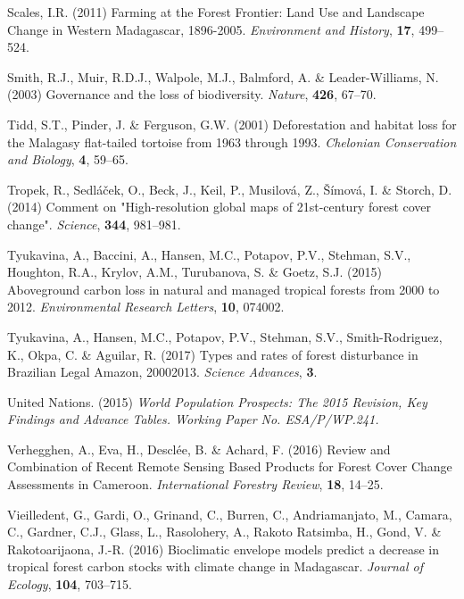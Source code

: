 \documentclass[]{article}
\theoremstyle{definition}
\theoremstyle{definition}
\theoremstyle{definition}
\theoremstyle{remark}
\begin{document}
\leavevmode\hypertarget{ref-Scales2011}{}%
Scales, I.R. (2011) Farming at the Forest Frontier: Land Use and
Landscape Change in Western Madagascar, 1896-2005. \emph{Environment and
History}, \textbf{17}, 499--524.

\leavevmode\hypertarget{ref-Smith2003}{}%
Smith, R.J., Muir, R.D.J., Walpole, M.J., Balmford, A. \&
Leader-Williams, N. (2003) Governance and the loss of biodiversity.
\emph{Nature}, \textbf{426}, 67--70.

\leavevmode\hypertarget{ref-Tidd2001}{}%
Tidd, S.T., Pinder, J. \& Ferguson, G.W. (2001) Deforestation and
habitat loss for the Malagasy flat-tailed tortoise from 1963 through
1993. \emph{Chelonian Conservation and Biology}, \textbf{4}, 59--65.

\leavevmode\hypertarget{ref-Tropek2014}{}%
Tropek, R., Sedláček, O., Beck, J., Keil, P., Musilová, Z., Šímová, I.
\& Storch, D. (2014) Comment on "High-resolution global maps of
21st-century forest cover change". \emph{Science}, \textbf{344},
981--981.

\leavevmode\hypertarget{ref-Tyukavina2015}{}%
Tyukavina, A., Baccini, A., Hansen, M.C., Potapov, P.V., Stehman, S.V.,
Houghton, R.A., Krylov, A.M., Turubanova, S. \& Goetz, S.J. (2015)
Aboveground carbon loss in natural and managed tropical forests from
2000 to 2012. \emph{Environmental Research Letters}, \textbf{10},
074002.

\leavevmode\hypertarget{ref-Tyukavina2017}{}%
Tyukavina, A., Hansen, M.C., Potapov, P.V., Stehman, S.V.,
Smith-Rodriguez, K., Okpa, C. \& Aguilar, R. (2017) Types and rates of
forest disturbance in Brazilian Legal Amazon, 20002013. \emph{Science
Advances}, \textbf{3}.

\leavevmode\hypertarget{ref-UN2015}{}%
United Nations. (2015) \emph{World Population Prospects: The 2015
Revision, Key Findings and Advance Tables. Working Paper No.
ESA/P/WP.241.}

\leavevmode\hypertarget{ref-Verhegghen2016}{}%
Verhegghen, A., Eva, H., Desclée, B. \& Achard, F. (2016) Review and
Combination of Recent Remote Sensing Based Products for Forest Cover
Change Assessments in Cameroon. \emph{International Forestry Review},
\textbf{18}, 14--25.

\leavevmode\hypertarget{ref-Vieilledent2016}{}%
Vieilledent, G., Gardi, O., Grinand, C., Burren, C., Andriamanjato, M.,
Camara, C., Gardner, C.J., Glass, L., Rasolohery, A., Rakoto Ratsimba,
H., Gond, V. \& Rakotoarijaona, J.-R. (2016) Bioclimatic envelope models
predict a decrease in tropical forest carbon stocks with climate change
in Madagascar. \emph{Journal of Ecology}, \textbf{104}, 703--715.
\end{document}

